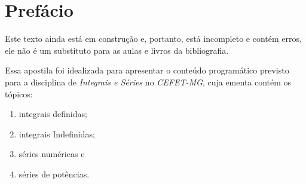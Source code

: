 \chapter{Prefácio}

%
%
%
%

\vspace{3cm}
\begin{observation}
  Este texto ainda está em construção e, portanto, está incompleto e contém erros,
  ele não é um substituto para as aulas e livros da bibliografia.
\end{observation}
\vspace{3cm}

Essa apostila foi idealizada para apresentar o conteúdo programático previsto para
a disciplina de \emph{Integrais e Séries} no \emph{CEFET-MG},
cuja ementa contém os tópicos:
\begin{enumerate}[nosep, topsep=-0.5\baselineskip]
  \item integrais definidas;
  \item integrais Indefinidas;
  \item séries numéricas e
  \item séries de potências.
\end{enumerate}

